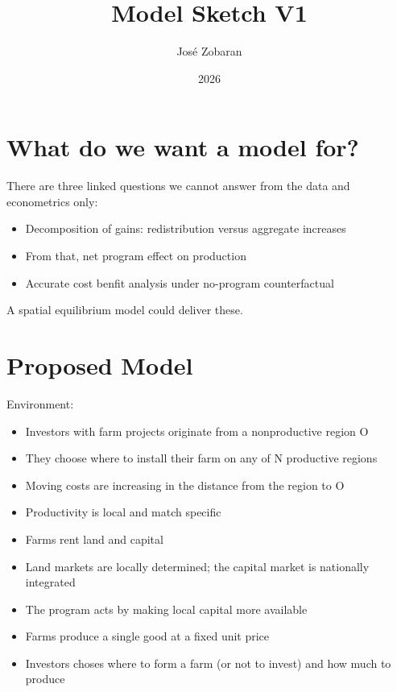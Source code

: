 \documentclass[12pt]{article}
\title{Model Sketch V1}
\author{José Zobaran}
\date{2026}
\begin{document}
\maketitle


\section{What do we want a model for?}
There are three linked questions we cannot answer from the data and econometrics only:
\begin{itemize}
  \item Decomposition of gains: redistribution versus aggregate increases
  \item From that, net program effect on production
  \item Accurate cost benfit analysis under no-program counterfactual
\end{itemize}
\vspace{1em}
A spatial equilibrium model could deliver these.

\section{Proposed Model}
Environment:
\begin{itemize}
  \item Investors with farm projects originate from a nonproductive region O
  \item They choose where to install their farm on any of N productive regions
  \item Moving costs are increasing in the distance from the region to O 
  \item Productivity is local and match specific
  \item Farms rent land and capital
  \item Land markets are locally determined; the capital market is nationally integrated  
  \item The program acts by making local capital more available
  \item Farms produce a single good at a fixed unit price
  \item Investors choses where to form a farm (or not to invest) and how much to produce
\end{itemize}
\vspace{1em}
\end{document}
